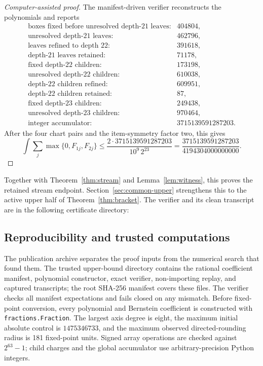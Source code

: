 \documentclass[11pt]{article}
\newcommand{\UpperBound}{\frac{3715139591287203}{4194304000000000}}
\begin{document}
\begin{proof}[Computer-assisted proof]
The manifest-driven verifier reconstructs the polynomials and reports
\[
\begin{array}{rl}
\text{boxes fixed before unresolved depth-21 leaves}:&404804,\\
\text{unresolved depth-21 leaves}:&462796,\\
\text{leaves refined to depth 22}:&391618,\\
\text{depth-21 leaves retained}:&71178,\\
\text{fixed depth-22 children}:&173198,\\
\text{unresolved depth-22 children}:&610038,\\
\text{depth-22 children refined}:&609951,\\
\text{depth-22 children retained}:&87,\\
\text{fixed depth-23 children}:&249438,\\
\text{unresolved depth-23 children}:&970464,\\
\text{integer accumulator}:&3715139591287203.
\end{array}
\]
After the four chart pairs and the item-symmetry factor two, this gives
\[
\int\sum_j\max\{0,F_{1j},F_{2j}\}
\leq
\frac{2\cdot3715139591287203}{10^9\,2^{23}}
=\boxed{\UpperBound}.
\]
\end{proof}
Together with Theorem~\ref{thm:stream} and Lemma~\ref{lem:witness}, this proves
the retained stream endpoint. Section~\ref{sec:common-upper} strengthens
this to the active upper half of Theorem~\ref{thm:bracket}.  The verifier and its
clean transcript are in the following certificate directory:
\begin{center}
\end{center}



\subsection{Reproducibility and trusted computations}

The publication archive separates the proof inputs from the numerical search
that found them.  The trusted upper-bound directory contains the rational
coefficient manifest, polynomial constructor, exact verifier, non-importing
replay, and captured transcripts; the root SHA-256 manifest covers these
files.  The verifier checks all manifest expectations and fails closed on any
mismatch.  Before fixed-point conversion, every polynomial and Bernstein
coefficient is constructed with \texttt{fractions.Fraction}.  The largest axis
degree is eight, the maximum initial absolute control is \(1475346733\), and
the maximum observed directed-rounding radius is 181 fixed-point units.
Signed array operations are checked against \(2^{63}-1\); child charges and
the global accumulator use arbitrary-precision Python integers.
\end{document}
